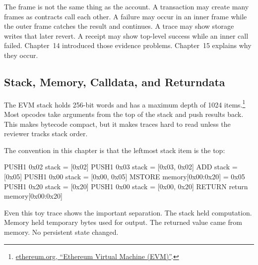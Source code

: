 The frame is not the same thing as the account. A transaction may create many frames as contracts call each other. A failure may occur in an inner frame while the outer frame catches the result and continues. A trace may show storage writes that later revert. A receipt may show top-level success while an inner call failed. Chapter~14 introduced those evidence problems. Chapter~15 explains why they occur.

\subsection{Stack, Memory, Calldata, and Returndata}

The EVM stack holds 256-bit words and has a maximum depth of 1024 items.\footnote{\href{https://ethereum.org/developers/docs/evm/}{ethereum.org, ``Ethereum Virtual Machine (EVM)''}.} Most opcodes take arguments from the top of the stack and push results back. This makes bytecode compact, but it makes traces hard to read unless the reviewer tracks stack order.

The convention in this chapter is that the leftmost stack item is the top:

\begin{codeblock}
PUSH1 0x02    stack = [0x02]
PUSH1 0x03    stack = [0x03, 0x02]
ADD           stack = [0x05]
PUSH1 0x00    stack = [0x00, 0x05]
MSTORE        memory[0x00:0x20] = 0x05
PUSH1 0x20    stack = [0x20]
PUSH1 0x00    stack = [0x00, 0x20]
RETURN        return memory[0x00:0x20]
\end{codeblock}

Even this toy trace shows the important separation. The stack held computation. Memory held temporary bytes used for output. The returned value came from memory. No persistent state changed.

